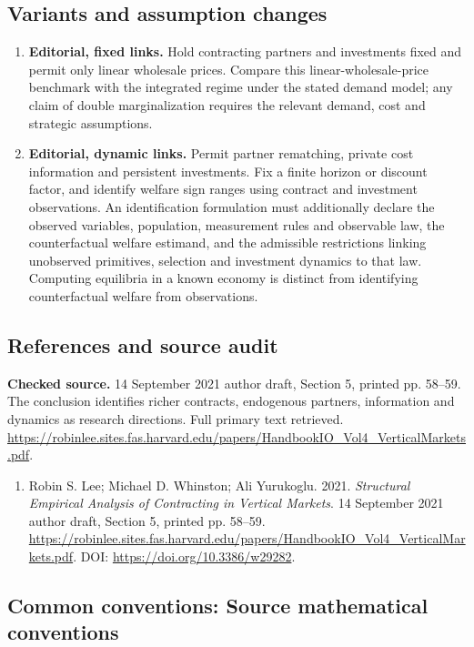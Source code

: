 \documentclass[11pt,a4paper]{article}
\begin{document}
\subsection*{Variants and assumption changes}
\begin{enumerate}
\item \textbf{Editorial, fixed links.} Hold contracting partners and investments fixed and permit only linear wholesale prices. Compare this linear-wholesale-price benchmark with the integrated regime under the stated demand model; any claim of double marginalization requires the relevant demand, cost and strategic assumptions.
\item \textbf{Editorial, dynamic links.} Permit partner rematching, private cost information and persistent investments. Fix a finite horizon or discount factor, and identify welfare sign ranges using contract and investment observations. An identification formulation must additionally declare the observed variables, population, measurement rules and observable law, the counterfactual welfare estimand, and the admissible restrictions linking unobserved primitives, selection and investment dynamics to that law. Computing equilibria in a known economy is distinct from identifying counterfactual welfare from observations.
\end{enumerate}
\subsection*{References and source audit}
\textbf{Checked source.} 14 September 2021 author draft, Section 5, printed pp. 58--59. The conclusion identifies richer contracts, endogenous partners, information and dynamics as research directions. Full primary text retrieved. \url{https://robinlee.sites.fas.harvard.edu/papers/HandbookIO_Vol4_VerticalMarkets.pdf}.
\begin{enumerate}\raggedright
\item\hypertarget{definitions:source:30007678:1}{} Robin S. Lee; Michael D. Whinston; Ali Yurukoglu. 2021. \emph{Structural Empirical Analysis of Contracting in Vertical Markets}. 14 September 2021 author draft, Section 5, printed pp. 58--59.
\url{https://robinlee.sites.fas.harvard.edu/papers/HandbookIO_Vol4_VerticalMarkets.pdf}.
DOI: \url{https://doi.org/10.3386/w29282}.
\end{enumerate}

\subsection*{Common conventions: Source mathematical conventions}
\end{document}
